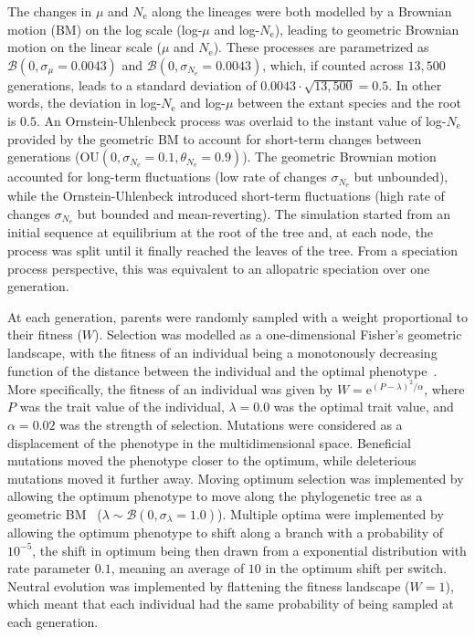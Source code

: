 \documentclass{article}
\newcommand{\Multiply}{\cdot}
\newcommand{\e}{\text{e}}
\newcommand{\Ne}{N_{\text{e}}}
\newcommand{\Trait}{P}
\newcommand{\MutationRatePheno}{\mu}
\newcommand{\brownian}{\mathcal{B}}
\begin{document}
The changes in $\MutationRatePheno$ and $\Ne$ along the lineages were both modelled by a Brownian motion (BM) on the log scale (log-$\MutationRatePheno$ and log-$\Ne$), leading to geometric Brownian motion on the linear scale ($\MutationRatePheno$ and $\Ne$).
These processes are parametrized as $\brownian \left(0, \sigma_{\MutationRatePheno}=0.0043\right)$ and $\brownian \left(0, \sigma_{\Ne}=0.0043\right)$, which, if counted across $13,500$ generations, leads to a standard deviation of $0.0043 \Multiply \sqrt {13,500} = 0.5$.
In other words, the deviation in log-$\Ne$ and log-$\MutationRatePheno$  between the extant species and the root is $0.5$.
An Ornstein-Uhlenbeck process was overlaid to the instant value of log-$\Ne$ provided by the geometric BM to account for short-term changes between generations ($\text{OU} \left(0, \sigma_{\Ne}=0.1, \theta_{\Ne}=0.9\right)$).
The geometric Brownian motion accounted for long-term fluctuations (low rate of changes $\sigma_{\Ne}$ but unbounded), while the Ornstein-Uhlenbeck introduced short-term fluctuations (high rate of changes $\sigma_{\Ne}$ but bounded and mean-reverting).
The simulation started from an initial sequence at equilibrium at the root of the tree and, at each node, the process was split until it finally reached the leaves of the tree.
From a speciation process perspective, this was equivalent to an allopatric speciation over one generation.

At each generation, parents were randomly sampled with a weight proportional to their fitness ($W$).
Selection was modelled as a one-dimensional Fisher's geometric landscape, with the fitness of an individual being a monotonously decreasing function of the distance between the individual and the optimal phenotype~\citep{tenaillon_utility_2014,blanquart_epistasis_2016}.
More specifically, the fitness of an individual was given by $W = \e^{(\Trait - \lambda)^2/ \alpha}$, where $\Trait$ was the trait value of the individual, $\lambda=0.0$ was the optimal trait value, and $\alpha=0.02$ was the strength of selection.
Mutations were considered as a displacement of the phenotype in the multidimensional space.
Beneficial mutations moved the phenotype closer to the optimum, while deleterious mutations moved it further away.
Moving optimum selection was implemented by allowing the optimum phenotype to move along the phylogenetic tree as a geometric BM~\citep{hansen_stabilizing_1997} ($\lambda \sim \brownian \left(0, \sigma_{\lambda}=1.0\right)$).
Multiple optima were implemented by allowing the optimum phenotype to shift along a branch with a probability of $10^{-5}$, the shift in optimum being then drawn from a exponential distribution with rate parameter $0.1$, meaning an average of $10$ in the optimum shift per switch.
Neutral evolution was implemented by flattening the fitness landscape ($W=1$), which meant that each individual had the same probability of being sampled at each generation.
\end{document}
